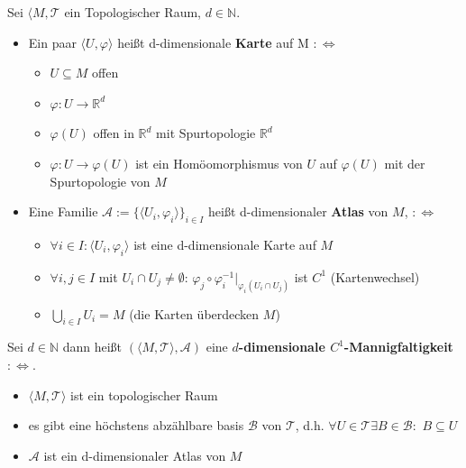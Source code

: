 {
    Sei $\langle M, \mathcal{T}$ ein Topologischer Raum, $d \in \mathbb{N}$.
    \begin{itemize}
        \item[(i)] Ein paar $\langle U, \varphi \rangle$ heißt d-dimensionale 
        \textbf{Karte} 
        auf M $:\Leftrightarrow$
        \begin{itemize}
            \item $U \subseteq M$ offen
            \item $\varphi: U \to \mathbb{R}^d$ 
            \item $\varphi(U)$ offen in $\mathbb{R}^d$ mit Spurtopologie $\mathbb{R}^d$
            \item $\varphi: U \to \varphi(U)$ ist ein Homöomorphismus von $U$ 
            auf $\varphi(U)$ mit der Spurtopologie von $M$
        \end{itemize}
        \item[(ii)] Eine Familie 
        $\mathcal{A}:= \{\langle U_i, \varphi_i \rangle\}_{i \in I}$ 
        heißt d-dimensionaler \textbf{Atlas} von $M$, 
        $:\Leftrightarrow$
        \begin{itemize}
            \item $\forall i \in I:\langle U_i, \varphi_i \rangle$ 
            ist eine d-dimensionale Karte auf $M$
            \item $\forall i,j \in I$ mit $U_i \cap U_j \neq \emptyset$: 
            $\varphi_j \circ \varphi_i^{-1}|_{\varphi_i(U_i \cap U_j)}$ ist $C^1$ (Kartenwechsel)
            \item $\bigcup_{i \in I} U_i = M$ (die Karten überdecken $M$)
        \end{itemize}
    \end{itemize}
}
{
Sei $d \in \mathbb{N}$ dann heißt $(\langle M, \mathcal{T} \rangle,\mathcal{A})$
eine \textbf{ $d$-dimensionale $C^1$-Mannigfaltigkeit}$:\Leftrightarrow$.
\begin{itemize}
    \item $\langle M, \mathcal{T} \rangle$ ist ein topologischer Raum
    \item es gibt eine höchstens abzählbare basis $\mathcal{B}$ von 
    $\mathcal{T}$, d.h. $\forall U \in \mathcal{T} \exists B \in \mathcal{B}:$ 
    $B \subseteq U$
    \item $\mathcal{A}$ ist ein d-dimensionaler Atlas von $M$
\end{itemize}
}
